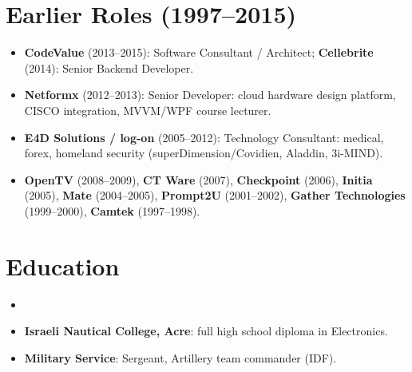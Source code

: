\documentclass[11pt,a4paper,sans]{moderncv}
\begin{document}

\section{Earlier Roles (1997--2015)}
\vspace{1pt}
\begin{itemize}
\item \textbf{CodeValue} (2013--2015): Software Consultant / Architect; \textbf{Cellebrite} (2014): Senior Backend Developer.
\item \textbf{Netformx} (2012--2013): Senior Developer: cloud hardware design platform, CISCO integration, MVVM/WPF course lecturer.
\item \textbf{E4D Solutions / log-on} (2005--2012): Technology Consultant: medical, forex, homeland security (superDimension/Covidien, Aladdin, 3i-MIND).
\item \textbf{OpenTV} (2008--2009), \textbf{CT Ware} (2007), \textbf{Checkpoint} (2006), \textbf{Initia} (2005), \textbf{Mate} (2004--2005), \textbf{Prompt2U} (2001--2002), \textbf{Gather Technologies} (1999--2000), \textbf{Camtek} (1997--1998).
\end{itemize}


\section{Education}
\vspace{1pt}
\begin{itemize}

\item{}

\vspace{3pt}

\item \textbf{Israeli Nautical College, Acre}: full high school diploma in Electronics.
\item \textbf{Military Service}: Sergeant, Artillery team commander (IDF).

\end{itemize}
\end{document}
